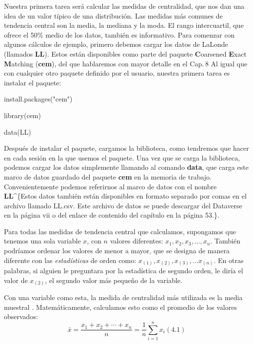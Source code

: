 \documentclass[
]{book}
\newenvironment{Shaded}{\begin{snugshade}}{\end{snugshade}}
\newcommand{\FunctionTok}[1]{\textcolor[rgb]{0.00,0.00,0.00}{#1}}
\newcommand{\NormalTok}[1]{#1}
\newcommand{\StringTok}[1]{\textcolor[rgb]{0.31,0.60,0.02}{#1}}
\begin{document}
Nuestra primera tarea será calcular las medidas de centralidad, que nos dan una idea de un valor típico de una distribución. Las medidas más comunes de tendencia central son la media, la mediana y la moda. El rango intercuartil, que ofrece el 50\% medio de los datos, también es informativo. Para comenzar con algunos cálculos de ejemplo, primero debemos cargar los datos de LaLonde (llamados \textbf{LL}). Estos están disponibles como parte del paquete \textbf{C}oarsened \textbf{E}xact \textbf{M}atching (\textbf{cem}), del que hablaremos con mayor detalle en el Cap. 8 Al igual que con cualquier otro paquete definido por el usuario, nuestra primera tarea es instalar el paquete:

\begin{Shaded}
\begin{Highlighting}[]
\FunctionTok{install.packages}\NormalTok{(}\StringTok{"cem"}\NormalTok{)}

\FunctionTok{library}\NormalTok{(cem)}

\FunctionTok{data}\NormalTok{(LL)}
\end{Highlighting}
\end{Shaded}

Después de instalar el paquete, cargamos la biblioteca, como tendremos que hacer en cada sesión en la que usemos el paquete. Una vez que se carga la biblioteca, podemos cargar los datos simplemente llamando al comando \textbf{data}, que carga este marco de datos guardado del paquete \textbf{cem} en la memoria de trabajo. Convenientemente podemos referirnos al marco de datos con el nombre \textbf{LL}\^{}\{Estos datos también están disponibles en formato separado por comas en el archivo llamado LL.csv. Este archivo de datos se puede descargar del Dataverse en la página vii o del enlace de contenido del capítulo en la página 53.\}.

Para todas las medidas de tendencia central que calculamos, supongamos que tenemos una sola variable \(x\), con \(n\) valores diferentes: \(x_{1}, x_{2}, x_{3}, \ldots, x_{n}\). También podríamos ordenar los valores de menor a mayor, que se designa de manera diferente con las \emph{estadísticas} de orden como: \(x_{(1)}, x_{(2)}, x_{(3)}, \ldots x_{(n)}\). En otras palabras, si alguien le preguntara por la estadística de segundo orden, le diría el valor de \(x_{(2)}\), el segundo valor más pequeño de la variable.

Con una variable como esta, la medida de centralidad más utilizada es la media muestral . Matemáticamente, calculamos esto como el promedio de los valores observados:
\[
\bar{x}=\frac{x_{1}+x_{2}+\cdots+x_{n}}{n}=\frac{1}{n} \sum_{i=1}^{n} x_{i}
(4.1)
\]
\end{document}
